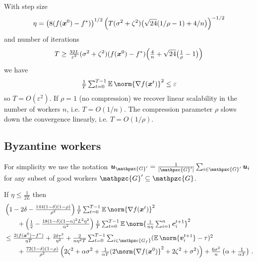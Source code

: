 \documentclass{article}
\newcommand{\gset}{\ensuremath{{\mathpzc{G}}}}
\newcommand{\gfset}{\ensuremath{{\mathpzc{G_f}}}}
\begin{document}
\begin{corollary}\label{app:cor:efsgd-convergence-rate}
  With step size 
  \[
  	\eta = \left(8(f(\bm{x}^0) - f^\ast)\right)^{1/2} \left(T  (\sigma^2+\zeta^2) \bigl(\sqrt{24} (1/\rho - 1) + 4 / n\bigr)\right)^{-1/2}
  \]
  and number of iterations 
  \[
    T \geq \tfrac{32 L}{\varepsilon^2} (\sigma^2+\zeta^2) (f(\bm{x}^0) - f^\ast) \Bigl(\tfrac{4}{n} + \sqrt{24} \bigl(\tfrac{1}{\rho} - 1\bigr)\Bigr)
  \]
  we have
  \[
    \tfrac{1}{T} \tsum_{t=0}^{T-1} \E \norm{\nabla f(\xx^t)}^2 \leq \varepsilon
  \]
  so $T = O(\varepsilon^2)$. If $\rho = 1$ (no compression) we recover linear scalability in the number of workers $n$, i.e. $T = O(1/n)$. The compression parameter $\rho$ slows down the convergence linearly, i.e. $T = O(1/\rho)$.
\end{corollary}


\subsection{Byzantine workers}


For simplicity we use the notation $\uu_{\gset'} = \tfrac{1}{|\gset'|} \tsum_{i\in\gset'} \uu_i$ for any subset of good workers $\gset' \subseteq \gset$.

\begin{theorem}\label{app:thm:convergence-byz}
  If $\eta \le \tfrac{1}{2L}$ then
  \begin{align*}
    & \left(1 - 2 \delta - \tfrac{144(1-\delta)(1-\rho)}{\rho^2} \right) \tfrac{1}{T} \tsum_{t=0}^{T-1} \E \norm{\nabla f(\xx^t)}^2 
    \\
     & \qquad + 
    \left( \tfrac{1}{2} - \tfrac{18(1-\delta)(1-\alpha)^2 L^2 \eta^2}{\alpha^2} \right) \tfrac{1}{T} \tsum_{t=0}^{T-1} \E \norm{\tfrac{1}{n \eta}\tsum_{i=1}^n \cc_i^{t+1}}^2
    \\
     & \le  
    \tfrac{2(f(\xx^0) - f^\ast)}{\eta T}
     + 
    \tfrac{2\delta\tau^2}{\eta^2}
     + 
    \tfrac{2}{n \eta^2 T} \tsum_{t=0}^{T-1} \tsum_{i\in\gfset} (\E \norm{ \vv_i^{t+1} } - \tau)^2 
    \\
     & \qquad + 
    \tfrac{72(1-\delta)(1-\rho)}{\rho^2} 
      \left(      
          2  \zeta^2
        + \alpha\sigma^2                                             
        + \tfrac{1}{\alpha T}(2\norm{\nabla f(\xx^0) }^2
        + 2 \zeta^2
        + \sigma^2)
      \right)
     +
    \tfrac{6\sigma^2}{n} \left(\alpha + \tfrac{1}{\alpha T}\right) \, .
  \end{align*}
\end{theorem}
\end{document}
